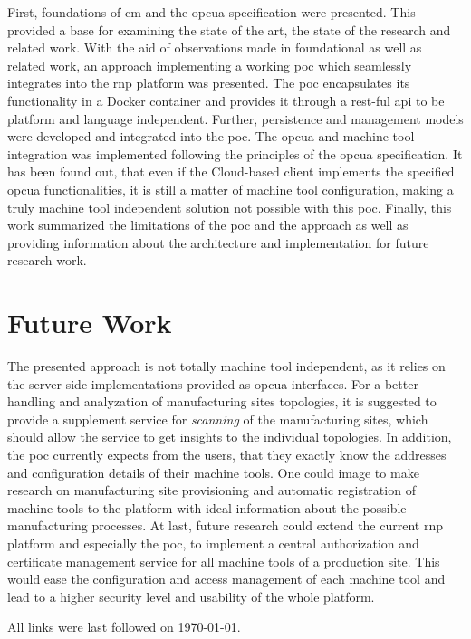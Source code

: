 \documentclass[
a4paper,
twoside,
headsepline,
cleardoublepage=empty,
parskip=half,
draft=false
]{scrbook}
\begin{document}
			First, foundations of \gls{cm} and the \gls{opcua} specification were presented. This provided a base for examining the state of the art, the state of the research and related work.
			With the aid of observations made in foundational as well as related work, an approach implementing a working \gls{poc} which seamlessly integrates into the \gls{rnp} platform was presented. 
			The \gls{poc} encapsulates its functionality in a Docker container and provides it through a \gls{rest}-ful \gls{api} to be platform and language independent. 
			Further, persistence and management models were developed and integrated into the \gls{poc}. 
			The \gls{opcua} and machine tool integration was implemented following the principles of the \gls{opcua} specification.
			It has been found out, that even if the Cloud-based client implements the specified \gls{opcua} functionalities, it is still a matter of machine tool configuration, making a truly machine tool independent solution not possible with this \gls{poc}. Finally, this work summarized the limitations of the \gls{poc} and the approach as well as providing information about the architecture and implementation for future research work.

		\section{Future Work}\label{sec:future_work}

			The presented approach is not totally machine tool independent, as it relies on the server-side implementations provided as \gls{opcua} interfaces. 
			For a better handling and analyzation of manufacturing sites topologies, it is suggested to provide a supplement service for \textit{scanning} of the manufacturing sites, which should allow the service to get insights to the individual topologies.
			In addition, the \gls{poc} currently expects from the users, that they exactly know the addresses and configuration details of their machine tools. One could image to make research on manufacturing site provisioning and automatic registration of machine tools to the platform with ideal information about the possible manufacturing processes.
			At last, future research could extend the current \gls{rnp} platform and especially the \gls{poc}, to implement a central authorization and certificate management service for all machine tools of a production site. 
			This would ease the configuration and access management of each machine tool and lead to a higher security level and usability of the whole platform.

	\clearpage


	\printbibliography

	All links were last followed on \today.

	\pagestyle{empty}
	\renewcommand*{\chapterpagestyle}{empty}
	\Versicherung
\end{document}
